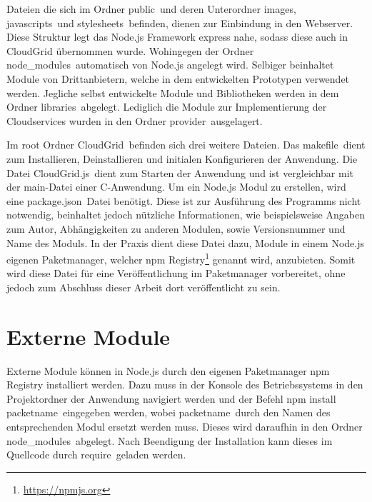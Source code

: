 Dateien die sich im Ordner \frqq public\flqq\ und deren Unterordner \frqq images\flqq , \frqq javascripts\flqq\ und \frqq stylesheets\flqq\ befinden, dienen zur Einbindung in den Webserver.
Diese Struktur legt das Node.js Framework express nahe, sodass diese auch in CloudGrid übernommen wurde.
Wohingegen der Ordner \frqq node\_modules\flqq\ automatisch von Node.js angelegt wird.
Selbiger beinhaltet Module von Drittanbietern, welche in dem entwickelten Prototypen verwendet werden.
Jegliche selbst entwickelte Module und Bibliotheken werden in dem Ordner \frqq libraries\flqq\ abgelegt.
Lediglich die Module zur Implementierung der Cloudservices wurden in den Ordner \frqq provider\flqq\ ausgelagert.

Im root Ordner \frqq CloudGrid\flqq\ befinden sich drei weitere Dateien.
Das \frqq makefile\flqq\ dient zum Installieren, Deinstallieren und initialen Konfigurieren der Anwendung.
Die Datei \frqq CloudGrid.js\flqq\ dient zum Starten der Anwendung und ist vergleichbar mit der main-Datei einer C-Anwendung.
Um ein Node.js Modul zu erstellen, wird eine \frqq package.json\flqq\ Datei benötigt.
Diese ist zur Ausführung des Programms nicht notwendig, beinhaltet jedoch nützliche Informationen, wie beispielsweise Angaben zum Autor, Abhängigkeiten zu anderen Modulen, sowie Versionsnummer und Name des Moduls.
In der Praxis dient diese Datei dazu, Module in einem Node.js eigenen Paketmanager, welcher npm Registry\footnote{\url{https://npmjs.org}} genannt wird, anzubieten.
Somit wird diese Datei für eine Veröffentlichung im Paketmanager vorbereitet, ohne jedoch zum Abschluss dieser Arbeit dort veröffentlicht zu sein.

\section{Externe Module}
\label{implementierung-externe-module}
Externe Module können in Node.js durch den eigenen Paketmanager npm Registry installiert werden.
Dazu muss in der Konsole des Betriebssystems in den Projektordner der Anwendung navigiert werden und der Befehl \frqq npm install packetname\flqq\ eingegeben werden, wobei \frqq packetname\flqq\ durch den Namen des entsprechenden Modul ersetzt werden muss.
Dieses wird daraufhin in den Ordner \frqq node\_modules\flqq\ abgelegt.
Nach Beendigung der Installation kann dieses im Quellcode durch \frqq require\flqq\ geladen werden.

